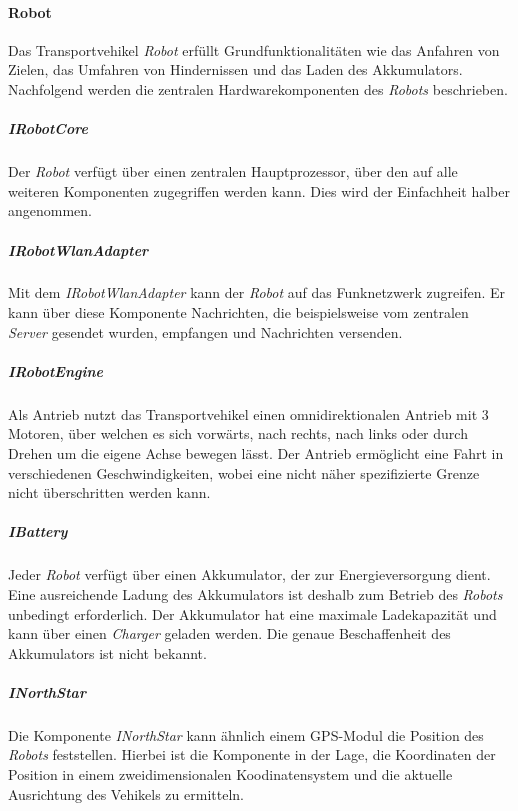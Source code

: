     \paragraph{Robot}\label{robot}

    Das Transportvehikel \emph{Robot} erfüllt Grundfunktionalitäten wie das
    Anfahren von Zielen, das Umfahren von Hindernissen und das Laden des
    Akkumulators. Nachfolgend werden die zentralen Hardwarekomponenten des
    \emph{Robots} beschrieben.

    \subparagraph{IRobotCore}\label{irobotcore}

    Der \emph{Robot} verfügt über einen zentralen Hauptprozessor, über den
    auf alle weiteren Komponenten zugegriffen werden kann. Dies wird der
    Einfachheit halber angenommen.

    \subparagraph{IRobotWlanAdapter}\label{irobotwlanadapter}

    Mit dem \emph{IRobotWlanAdapter} kann der \emph{Robot} auf das Funknetzwerk
    zugreifen. Er kann über diese Komponente Nachrichten, die beispielsweise vom
    zentralen \emph{Server} gesendet wurden, empfangen und Nachrichten versenden.

    \subparagraph{IRobotEngine}\label{irobotengine}

    Als Antrieb nutzt das Transportvehikel einen omnidirektionalen Antrieb
    mit 3 Motoren, über welchen es sich vorwärts, nach rechts, nach links
    oder durch Drehen um die eigene Achse bewegen lässt. Der Antrieb
    ermöglicht eine Fahrt in verschiedenen Geschwindigkeiten, wobei eine
    nicht näher spezifizierte Grenze nicht überschritten werden kann.

    \subparagraph{IBattery}\label{ibattery}

    Jeder \emph{Robot} verfügt über einen Akkumulator, der zur
    Energieversorgung dient. Eine ausreichende Ladung des Akkumulators ist
    deshalb zum Betrieb des \emph{Robots} unbedingt erforderlich. Der
    Akkumulator hat eine maximale Ladekapazität und kann über einen
    \emph{Charger} geladen werden. Die genaue Beschaffenheit des
    Akkumulators ist nicht bekannt.

    \subparagraph{INorthStar}\label{inorthstar}

    Die Komponente \emph{INorthStar} kann ähnlich einem GPS-Modul die
    Position des \emph{Robots} feststellen. Hierbei ist die Komponente in
    der Lage, die Koordinaten der Position in einem zweidimensionalen
    Koodinatensystem und die aktuelle Ausrichtung des Vehikels zu ermitteln.

